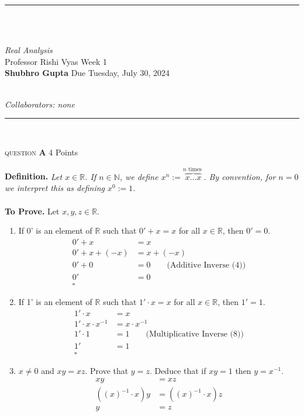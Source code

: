\documentclass[11pt]{article}
\newcommand{\problem
}[2]{
\begin{mdframed}
    \textsc{question} \textbf{#1} \hfill #2
\end{mdframed}
}
\newcommand{\heading}[5]{
\hrule ~\\~\\
\begin{large}
\noindent\emph{#1}\smallskip ~\\
Professor #3 \hfill Week #2 \smallskip ~\\
\textbf{Shubhro Gupta} \hfill Due #4 ~\\
\end{large} \medskip ~\\
{\emph{Collaborators: #5}}~\\
\hrule
\vspace{50pt}
~\\
}
\begin{document}
\heading{Real Analysis}{1}{Rishi Vyas}{Tuesday, July 30, 2024}{none}

\problem{A}{4 Points}
\textbf{Definition.} \emph{Let $x \in \mathbb{R}$. If $n \in \mathbb{N}$, we define $x^n:=\overbrace{x \ldots x}^{n \text { times }}$. By convention, for $n=0$ we interpret this as defining $x^0:=1$.}~\\
\\
\textbf{To Prove.}  Let $x, y, z \in \mathbb{R}$.

\begin{enumerate}
	\item If 0' is an element of $\mathbb{R}$ such that $0'+x=x$ for all $x \in \mathbb{R}$, then $0'=0$.
	      \begin{align*}
		      0' + x        & = x                                             \\
		      0' + x + (-x) & = x + (-x)                                      \\
		      0' + 0        & = 0        \qquad \text{(Additive Inverse (4))} \\
		      0'            & = 0                                             \\
		      \square
	      \end{align*}
	\item If 1' is an element of $\mathbb{R}$ such that $1' \cdot x=x$ for all $x \in \mathbb{R}$, then $1'=1$.
	      \begin{align*}
		      1' \cdot x              & = x                                                   \\
		      1' \cdot x \cdot x^{-1} & = x \cdot x^{-1}                                      \\
		      1' \cdot 1              & = 1        \qquad \text{(Multiplicative Inverse (8))} \\
		      1'                      & = 1                                                   \\
		      \square
	      \end{align*}
	\item $x \neq 0$ and $x y=x z$. Prove that $y=z$. Deduce that if $x y=1$ then $y=x^{-1}$.
	      \begin{align*}
		      x y                  & = x z                  \\
		      ((x)^{-1} \cdot x) y & = ((x)^{-1} \cdot x) z \\
		      y                    & = z                    \\

\end{align*}
\end{enumerate}
\end{document}
